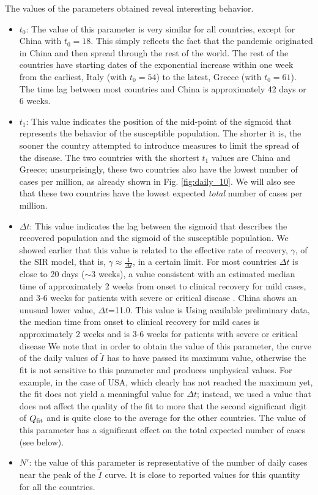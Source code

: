 \documentclass[aps,preprint]{revtex4}
\newcommand{\Itild}{{\tilde I}}
\begin{document}
The values of the parameters obtained reveal interesting behavior.
\begin{itemize}
\item{$t_0$: 
The value of this parameter is very similar for all countries, except for China
with $t_0 = 18$. 
This simply reflects the fact that the pandemic originated in China and then 
spread through the rest of the world. The rest of the countries have starting dates 
of the exponential increase within one week from the earliest, Italy (with $t_0 = 54$)
to the latest, Greece (with $t_0 = 61$).
The time lag between most countries and China is approximately 42 days or 6 weeks. 
}
\item{$t_1$: 
This value indicates the position of the mid-point of the sigmoid that 
represents the behavior of the susceptible population. 
The shorter it is, the sooner the country attempted to introduce measures 
to limit the spread of the disease.  The two countries with the shortest $t_1$ values 
are China and Greece; unsurprisingly, these two countries also have the lowest 
number of cases per million, as already shown in Fig. \ref{fig:daily_10}. 
We will also see that these two countries have the lowest expected {\em total} number
of cases per million. 
}
\item{$\Delta t$: 
This value indicates the lag between the sigmoid that describes the recovered 
population and the sigmoid of the susceptible population. We showed earlier 
that this value is related to the effective rate of recovery, $\gamma$, of the SIR model, 
that is, $\gamma \approx \frac {1}{\Delta t}$, in a certain limit. 
For most countries $\Delta t$ is close to 20 days ($\sim 3$ weeks), a value consistent with an estimated median time of approximately 2 weeks from onset to clinical recovery for mild cases, and 3-6 weeks for patients with severe or critical disease \cite{WHO_China_2020}. China shows an unusual lower value, $\Delta t$=11.0.
This value is Using available preliminary data, the median time from onset to clinical recovery for mild cases is approximately 2 weeks and is 3-6 weeks for patients with severe or critical disease
We note that in order to obtain the value of this parameter, the curve of the 
daily values of $\Itild$ has to have passed its maximum value, otherwise the 
fit is not sensitive to this parameter and produces unphysical values.  
For example, in the case of USA, which 
clearly has not reached the maximum yet, the fit does not yield a meaningful value for 
$\Delta t$; instead, we used a value that does not affect the quality of the fit 
to more that the second significant digit of $Q_{\rm fit}$ and is 
quite close to the average for the other countries. The value of this parameter 
has a significant effect on the total expected number of cases (see below). 
}
\item{$N'$: the value of this parameter is representative of the number of daily cases 
near the peak of the $\Itild$ curve. It is close to reported values for this quantity for 
all the countries. 
}
\end{itemize}
\end{document}
